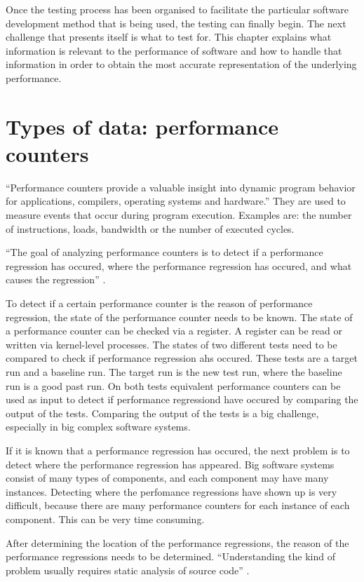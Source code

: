 Once the testing process has been organised to facilitate the particular software development method that is being used, the testing can finally begin. The next challenge that presents itself is what to test for. This chapter explains what information is relevant to the performance of software and how to handle that information in order to obtain the most accurate representation of the underlying performance.


\section{Types of data: performance counters}
``Performance counters provide a valuable insight into dynamic program behavior for applications, compilers, operating systems and hardware.''\cite{zagha1996performance}
They are used to measure events that occur during program execution. Examples are: the number of instructions, loads, bandwidth or the number of executed cycles.

``The goal of analyzing performance counters is to detect if a performance regression has occured, where the performance regression has occured, and what causes the regression'' \cite{nguyen2012using}.

To detect if a certain performance counter is the reason of performance regression, the state of the performance counter needs to be known. The state of a performance counter can be checked via a register. A register can be read or written via kernel-level processes. The states of two different tests need to be compared to check if performance regression ahs occured. These tests are a target run and a baseline run. The target run is the new test run, where the baseline run is a good past run. On both tests equivalent performance counters can be used as input to detect if performance regressiond have occured by comparing the output of the tests. Comparing the output of the tests is a big challenge, especially in big complex software systems.

If it is known that a performance regression has occured, the next problem is to detect where the performance regression has appeared. Big software systems consist of many types of components, and each component may have many instances. Detecting where the perfomance regressions have shown up is very difficult, because there are many performance counters for each instance of each component. This can be very time consuming.

After determining the location of the performance regressions, the reason of the performance regressions needs to be determined. ``Understanding the kind of problem usually requires static analysis of source code'' \cite{nguyen2012using}.

